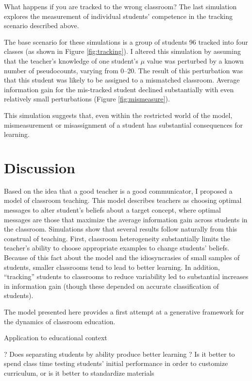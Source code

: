 \documentclass[10pt,letterpaper]{article}
\begin{document}
What happens if you are tracked to the wrong classroom? The last simulation explores the measurement of individual students' competence in the tracking scenario described above. 

The base scenario for these simulations is a group of students 96 tracked into four classes (as shown in Figure \ref{fig:tracking}). I altered this simulation by assuming that the teacher's knowledge of one student's $\mu$ value was perturbed by a known number of pseudocounts, varying from 0--20. The result of this perturbation was that this student was likely to be assigned to a mismatched classroom. Average information gain for the mis-tracked student declined substantially with even relatively small perturbations (Figure \ref{fig:mismeasure}). 

This simulation suggests that, even within the restricted world of the model, mismeasurement or misassignment of a student has substantial consequences for learning.

\section{Discussion}

Based on the idea that a good teacher is a good communicator, I proposed a model of classroom teaching. This model describes teachers as choosing optimal messages to alter student's beliefs about a target concept, where optimal messages are those that maximize the average information gain across students in the classroom. Simulations show that several results follow naturally from this construal of teaching. First, classroom heterogeneity substantially limits the teacher's ability to choose appropriate examples to change students' beliefs. Because of this fact about the model and the idiosyncrasies of small samples of students, smaller classrooms tend to lead to better learning. In addition, ``tracking'' students to classrooms to reduce variability led to substantial increases in information gain (though these depended on accurate classification of students).

The model presented here provides a first attempt at a generative framework for the dynamics of classroom education. 

Application to educational context

\cite{glass1979,slavin1989}? Does separating students by ability produce better learning \cite{slavin1987,wheelock1992}? Is it better to spend class time testing students' initial performance in order to customize curriculum, or is it better to standardize materials \cite{fuchs1986}
\end{document}
